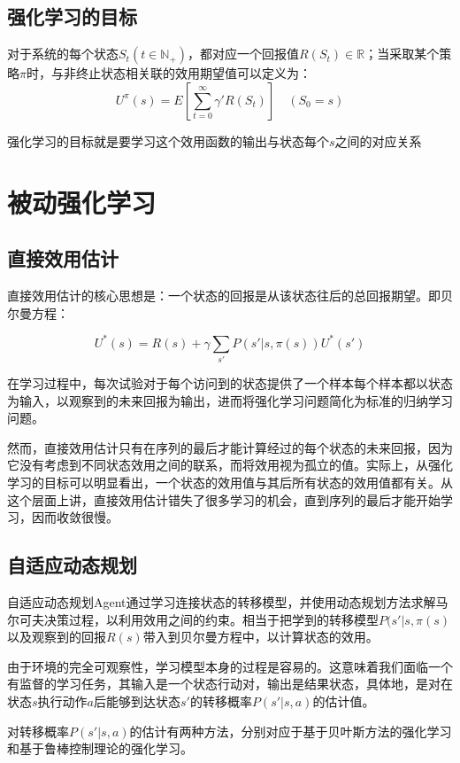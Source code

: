 \documentclass[a4paper]{ctexart}
\begin{document}
\subsection{强化学习的目标}

对于系统的每个状态$S_t(t\in\mathbb N_+)$，都对应一个回报值$R(S_t)\in\mathbb R$；当采取某个策略$\pi$时，与非终止状态相关联的效用期望值可以定义为：
$$U^\pi(s)=E\left[\sum_{t=0}^\infty\gamma'R(S_t)\right]\quad(S_0=s)$$

强化学习的目标就是要学习这个效用函数的输出与状态每个$s$之间的对应关系

\section{被动强化学习}

\subsection{直接效用估计}

直接效用估计的核心思想是：一个状态的回报是从该状态往后的总回报期望。即贝尔曼方程：

$$U^*(s)=R(s)+\gamma\sum_{s'}P(s'|s,\pi(s))U^*(s')$$

在学习过程中，每次试验对于每个访问到的状态提供了一个样本每个样本都以状态为输入，以观察到的未来回报为输出，进而将强化学习问题简化为标准的归纳学习问题。

然而，直接效用估计只有在序列的最后才能计算经过的每个状态的未来回报，因为它没有考虑到不同状态效用之间的联系，而将效用视为孤立的值。实际上，从强化学习的目标可以明显看出，一个状态的效用值与其后所有状态的效用值都有关。从这个层面上讲，直接效用估计错失了很多学习的机会，直到序列的最后才能开始学习，因而收敛很慢。

\subsection{自适应动态规划}

自适应动态规划Agent通过学习连接状态的转移模型，并使用动态规划方法求解马尔可夫决策过程，以利用效用之间的约束。相当于把学到的转移模型$P(s'|s,\pi(s)$以及观察到的回报$R(s)$带入到贝尔曼方程中，以计算状态的效用。

由于环境的完全可观察性，学习模型本身的过程是容易的。这意味着我们面临一个有监督的学习任务，其输入是一个状态行动对，输出是结果状态，具体地，是对在状态$s$执行动作$a$后能够到达状态$s'$的转移概率$P(s'|s,a)$的估计值。

对转移概率$P(s'|s,a)$的估计有两种方法，分别对应于基于贝叶斯方法的强化学习和基于鲁棒控制理论的强化学习。
\end{document}
